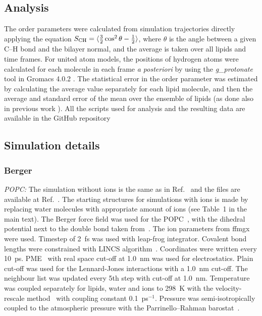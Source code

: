 \documentclass[twoside,twocolumn,9pt]{article}
\begin{document}
\subsection{Analysis}
The order parameters were calculated from simulation trajectories directly applying the equation
$S_{{\rm CH}}=\langle \frac{3}{2}  \cos^2 \theta-\frac{1}{2} \rangle$,
where $\theta$ is the angle between a given C--H bond and the bilayer normal, and the average is taken
over all lipids and time frames. For united atom models, the positions of hydrogen atoms
were calculated for each molecule in each frame \textit{a posteriori} by using the {\it g\_protonate} tool in 
Gromacs 4.0.2 \cite{gromacsMANUAL402}. 
The statistical error in the order parameter was estimated by calculating the average value separately for each lipid molecule,
and then the average and standard error of the mean over the ensemble of lipids (as done also in previous work \cite{botan15}).
All the scripts used for analysis and the resulting data are available in the GitHub repository \cite{githubIONpaper}

\subsection{Simulation details}

\subsubsection{Berger}
{\it POPC:} The simulation without ions is the same as in Ref.~ and the files are available at Ref.~. 
The starting structures for simulations with ions is made by replacing water molecules with appropriate amount of ions (see Table~1 in the main text).
The Berger force field was used for the POPC~\cite{berger97}, with the dihedral potential next to the double bond 
taken from~\cite{bachar04}. The ion parameters from ffmgx~\cite{straatsma88} were used.
Timestep of 2~fs was used with leap-frog integrator. Covalent bond lengths were constrained with LINCS algorithm~\cite{hess97,hess07}. 
Coordinates were written every 10~ps. PME~\cite{darden93,essman95} with real space cut-off at 1.0~nm was used 
for electrostatics. Plain cut-off was used for the Lennard-Jones interactions with a 1.0~nm cut-off.
The neighbour list was updated every 5th step with cut-off at 1.0~nm. Temperature was coupled separately
for lipids, water and ions to 298~K with the velocity-rescale method~\cite{bussi07} with coupling constant 0.1~ps$^{-1}$.
Pressure was semi-isotropically coupled to the atmospheric pressure with the Parrinello--Rahman barostat~\cite{parrinello81}.
\end{document}
